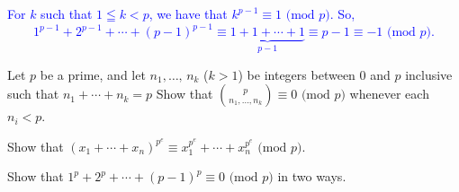 \documentclass[a4paper,11pt]{article}
\theoremstyle{mythm}
\theoremstyle{mydef}
\newcommand{\blue}[1]{\textcolor{blue}{#1}}
\renewcommand{\pmod}[1]{\text{ (mod $#1$)}}
\begin{document}
\blue{
  For $k$ such that $1 \leqq k < p$, we have that $k^{p-1} \equiv 1 \pmod{p}$.
  So,
  \[
    1^{p-1}+2^{p-1}+\cdots+(p-1)^{p-1} \equiv \underbrace{1+1+\cdots+1}_{p-1}
    \equiv p-1 \equiv -1 \pmod{p}.
  \]
}

\begin{enumerate*}[{\bf (a)}]
\item Let $p$ be a prime, and let $n_1,\dots,\,n_k$ ($k>1$) be integers between
  0 and $p$ inclusive such that $n_1+\cdots+n_k=p$ Show that
  $\binom{p}{n_1,\dots,n_k} \equiv 0 \pmod{p}$ whenever each $n_i < p$.
\item Show that $(x_1+\cdots+x_n)^{p^e} \equiv x_1^{p^e}+\cdots+x_n^{p^e} \pmod{p}$.
\item Show that $1^p+2^p+\cdots+(p-1)^p \equiv 0 \pmod{p}$ in two ways.
\end{enumerate*}
\end{document}
